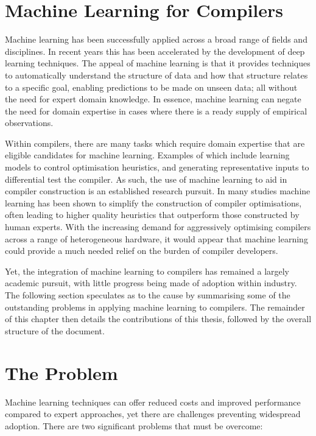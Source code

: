 \section{Machine Learning for Compilers}

Machine learning has been successfully applied across a broad range of fields and disciplines. In recent years this has been accelerated by the development of deep learning techniques. The appeal of machine learning is that it provides techniques to automatically understand the structure of data and how that structure relates to a specific goal, enabling predictions to be made on unseen data; all without the need for expert domain knowledge. In essence, machine learning can negate the need for domain expertise in cases where there is a ready supply of empirical observations.

Within compilers, there are many tasks which require domain expertise that are eligible candidates for machine learning. Examples of which include learning models to control optimisation heuristics, and generating representative inputs to differential test the compiler. As such, the use of machine learning to aid in compiler construction is an established research pursuit. In many studies machine learning has been shown to simplify the construction of compiler optimisations, often leading to higher quality heuristics that outperform those constructed by human experts. With the increasing demand for aggressively optimising compilers across a range of heterogeneous hardware, it would appear that machine learning could provide a much needed relief on the burden of compiler developers.

Yet, the integration of machine learning to compilers has remained a largely academic pursuit, with little progress being made of adoption within industry. The following section speculates as to the cause by summarising some of the outstanding problems in applying machine learning to compilers. The remainder of this chapter then details the contributions of this thesis, followed by the overall structure of the document.


\section{The Problem}

Machine learning techniques can offer reduced costs and improved performance compared to expert approaches, yet there are challenges preventing widespread adoption. There are two significant problems that must be overcome:

